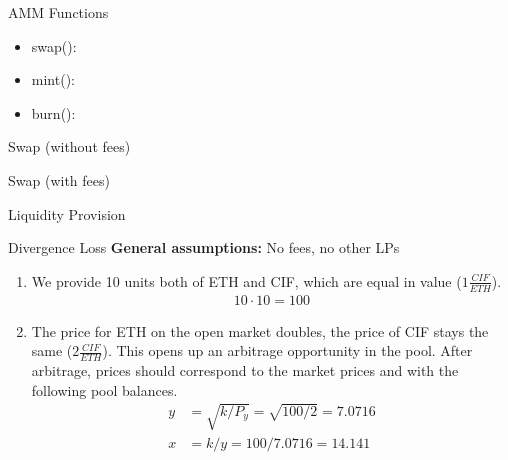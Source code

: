 \documentclass[]{beamer}
\begin{document}
\begin{frame}{AMM Functions}
	\begin{itemize}
		\item<1-> swap():
		\item<2-> mint():
		\item<3-> burn(): 
	\end{itemize}
\end{frame}

\begin{frame}{Swap (without fees)}
	\only<1>{
		\begin{figure}[h!]
			\begin{center}
				
			\end{center}
		\end{figure}
	}


\end{frame}


\begin{frame}{Swap (with fees)}
	
\end{frame}


\begin{frame}{Liquidity Provision}

\end{frame}


\begin{frame}{Divergence Loss}
		\textbf{General assumptions:} No fees, no other LPs \\ 
		
		\begin{enumerate}
			\item We provide 10 units both of ETH and CIF, which are equal in value ($1 \tfrac{CIF}{ETH}$).
			\begin{align*}
			10 \cdot 10 = 100	
			\end{align*}
			\item The price for ETH on the open market doubles, the price of CIF stays the same ($2 \tfrac{CIF}{ETH}$). This opens up an arbitrage opportunity in the pool. After arbitrage, prices should correspond  to the market prices and with the following pool balances.
			\begin{align*}
			y &= \sqrt{k/P_{y}}	 = \sqrt{100/2} = 7.0716 \\
			x &= k / y = 100 / 7.0716 = 14.141
			\end{align*}
		\end{enumerate}
		
\end{frame}
\end{document}
